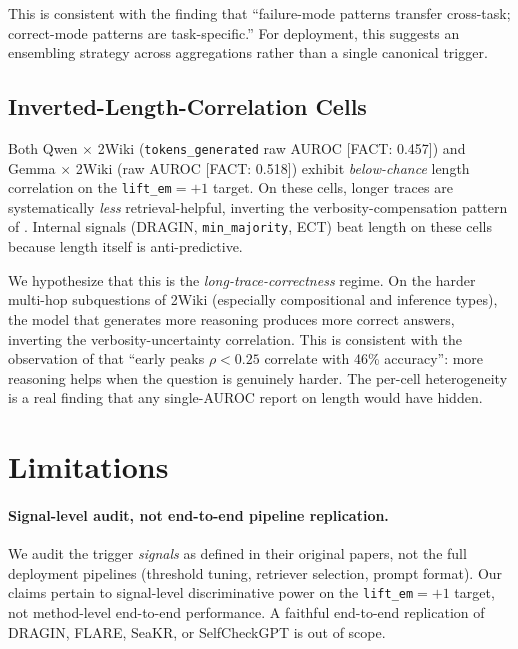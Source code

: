 \documentclass[11pt]{article}
\newcommand{\FACT}[1]{{\color{blue}\textsf{[FACT: #1]}}}
\begin{document}
This is consistent with the \cite{Mao_ConfidenceOverTimeSTL} finding that
``failure-mode patterns transfer cross-task; correct-mode patterns are
task-specific.'' For deployment, this suggests an ensembling strategy across
aggregations rather than a single canonical trigger.

\subsection{Inverted-Length-Correlation Cells}
\label{sec:discussion-inverted}

Both Qwen $\times$ 2Wiki (\texttt{tokens\_generated} raw AUROC \FACT{0.457})
and Gemma $\times$ 2Wiki (raw AUROC \FACT{0.518}) exhibit \emph{below-chance}
length correlation on the \texttt{lift\_em}$=+1$ target. On these cells,
longer traces are systematically \emph{less} retrieval-helpful, inverting the
verbosity-compensation pattern of \cite{Zhang_VerbosityVeracityVCBehavior}.
Internal signals (DRAGIN, \texttt{min\_majority}, ECT) beat length on
these cells because length itself is anti-predictive.

We hypothesize that this is the \emph{long-trace-correctness} regime. On the
harder multi-hop subquestions of 2Wiki (especially compositional and
inference types), the model that generates more reasoning produces more
correct answers, inverting the verbosity-uncertainty correlation. This is
consistent with the observation of \cite{Chen_DynamicInstabilityLLMReasoning}
that ``early peaks $\rho < 0.25$ correlate with 46\% accuracy'': more
reasoning helps when the question is genuinely harder. The per-cell
heterogeneity is a real finding that any single-AUROC report on length would
have hidden.


\section{Limitations}
\label{sec:limitations}

\paragraph{Signal-level audit, not end-to-end pipeline replication.} We
audit the trigger \emph{signals} as defined in their original papers, not
the full deployment pipelines (threshold tuning, retriever selection, prompt
format). Our claims pertain to signal-level discriminative power on the
\texttt{lift\_em}$=+1$ target, not method-level end-to-end performance. A
faithful end-to-end replication of DRAGIN, FLARE, SeaKR, or SelfCheckGPT is
out of scope.
\end{document}

